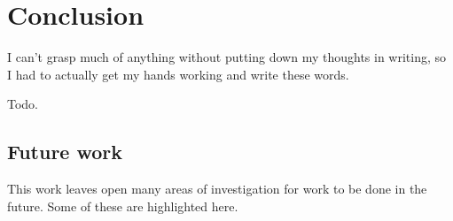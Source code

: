 
\chapter{Conclusion}

\epigraph{
  I can't grasp much of anything without putting down my thoughts in writing, so I had to actually get my hands working and write these words.
}{\textcite{murakami2008}}

Todo.

\section{Future work}

This work leaves open many areas of investigation for work to be done in the future.
Some of these are highlighted here.


